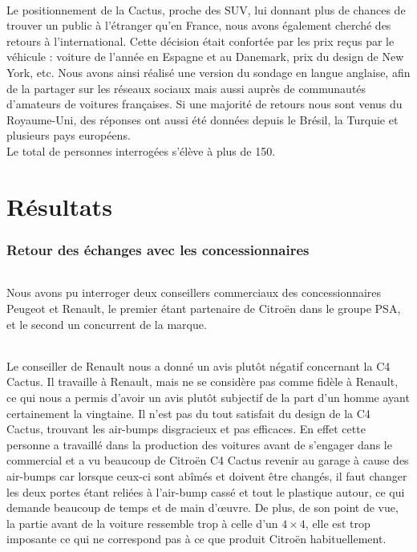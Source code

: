 \documentclass[12pt]{article}\usepackage[]{graphicx}\usepackage[]{color}
\begin{document}
\paragraph{} Le positionnement de la Cactus, proche des SUV, lui donnant plus
de chances de trouver un public à l'étranger qu'en France, nous avons également
cherché des retours à l'international. Cette décision était confortée par les
prix reçus par le véhicule : voiture de l'année en Espagne et au Danemark, prix
du design de New York, etc. Nous avons ainsi réalisé une version du
sondage en langue anglaise, afin de la partager sur les réseaux sociaux mais
aussi auprès de communautés d'amateurs de voitures françaises. Si une majorité
de retours nous sont venus du Royaume-Uni, des réponses ont aussi été données
depuis le Brésil, la Turquie et plusieurs pays européens.\\

\noindent Le total de personnes interrogées s'élève à plus de 150.

\part{Résultats}

\section{Retour des échanges avec les concessionnaires}

\paragraph{} Nous avons pu interroger deux conseillers commerciaux des
concessionnaires Peugeot et Renault, le premier étant partenaire de Citroën dans
le groupe PSA, et le second un concurrent de la marque.

\paragraph{} Le conseiller de Renault nous a donné un avis plutôt négatif
concernant la C4 Cactus. Il travaille à Renault, mais ne se considère pas comme
fidèle à Renault, ce qui nous a permis d'avoir un avis plutôt subjectif de la
part d'un homme ayant certainement la vingtaine. Il n'est pas du tout satisfait
du design de la C4 Cactus, trouvant les air-bumps disgracieux et pas efficaces.
En effet cette personne a travaillé dans la production des voitures avant de
s'engager dans le commercial et a vu beaucoup de Citroën C4 Cactus revenir au
garage à cause des air-bumps car lorsque ceux-ci sont abîmés et doivent être
changés, il faut changer les deux portes étant reliées à l'air-bump cassé et
tout le plastique autour, ce qui demande beaucoup de temps et de main d'œuvre.
De plus, de son point de vue, la partie avant de la voiture ressemble trop à
celle d'un $4 \times 4$, elle est trop imposante ce qui ne correspond pas à ce que
produit Citroën habituellement.
\end{document}
